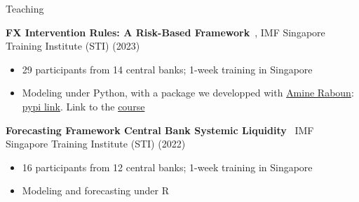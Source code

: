 \documentclass[usegeometry, 10pt, a4paper]{cv} %
\newcommand{\activite}[1]{\textbf{#1}\ }
\newcommand{\midreduce}{-0.5cm}
\begin{document}
\begin{rubriquetableau}[0.95\textwidth]{Teaching}\\
\vspace{-0.5cm}

\small    
\activite{FX Intervention Rules: A Risk-Based Framework}, IMF Singapore Training Institute (STI) (2023)\\
  \vspace{\midreduce}
  \begin{itemize}[label={}]
  \item \small{29 participants from 14 central banks; 1-week training in Singapore}    
  \item \small{Modeling under Python, with a package we developped with \href{https://amineraboun.github.io/}{Amine Raboun}: \href{https://pypi.org/project/varfxi/}{pypi link}. Link to the \href{https://amineraboun.github.io/STI_FX_Intervention/docs/index.html}{course}}
  \end{itemize}

  \vspace{0.3cm}

\small      
  \activite{Forecasting Framework Central Bank Systemic Liquidity} IMF Singapore Training Institute (STI) (2022)\\
  \vspace{\midreduce}
  \begin{itemize}[label={}]
  \item \small{16 participants from 12 central banks; 1-week training in Singapore}
  \item \small{Modeling and forecasting under R}    
  \end{itemize}




\end{rubriquetableau}
\end{document}
